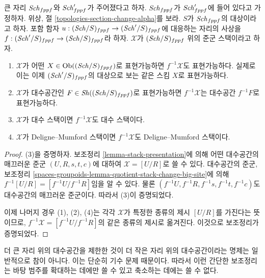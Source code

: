 \begin{lemma}
\label{lemma-change-big-site}
큰 자리 $\mathit{Sch}_{fppf}$와 $\mathit{Sch}'_{fppf}$가 주어졌다고 하자.
$\mathit{Sch}_{fppf}$가 $\mathit{Sch}'_{fppf}$에 들어 있다고 가정하자. 위상, 절
\ref{topologies-section-change-alpha}를 보라. $S$가 $\mathit{Sch}_{fppf}$의
대상이라고 하자. 포함 함자
$u : (\mathit{Sch}/S)_{fppf} \to (\mathit{Sch}'/S)_{fppf}$에 대응하는 자리의 사상을
$f : (\mathit{Sch}'/S)_{fppf} \to (\mathit{Sch}/S)_{fppf}$라 하자. $\mathcal{X}$가
$(\mathit{Sch}/S)_{fppf}$ 위의 준군 스택이라고 하자.
\begin{enumerate}
\item $\mathcal{X}$가 어떤 $X \in \mathop{\mathrm{Ob}}\nolimits((\mathit{Sch}/S)_{fppf})$로 표현가능하면
$f^{-1}\mathcal{X}$도 표현가능하다. 실제로 이는 이제
$(\mathit{Sch}'/S)_{fppf}$의 대상으로 보는 같은 스킴 $X$로 표현가능하다.
\item $\mathcal{X}$가 대수공간인 $F \in \mathop{\mathit{Sh}}\nolimits((\mathit{Sch}/S)_{fppf})$로
표현가능하면 $f^{-1}\mathcal{X}$는 대수공간 $f^{-1}F$로 표현가능하다.
\item $\mathcal{X}$가 대수 스택이면 $f^{-1}\mathcal{X}$도 대수 스택이다.
\item $\mathcal{X}$가 Deligne--Mumford 스택이면 $f^{-1}\mathcal{X}$도
Deligne--Mumford 스택이다.
\end{enumerate}
\end{lemma}

\begin{proof}
(3)을 증명하자. 보조정리 \ref{lemma-stack-presentation}에 의해 어떤
대수공간의 매끄러운 준군 $(U, R, s, t, c)$에 대하여
$\mathcal{X} = [U/R]$로 쓸 수 있다. 대수공간의 준군, 보조정리
\ref{spaces-groupoids-lemma-quotient-stack-change-big-site}에 의해
$f^{-1}[U/R] = [f^{-1}U/f^{-1}R]$임을 알 수 있다. 물론
$(f^{-1}U, f^{-1}R, f^{-1}s, f^{-1}t, f^{-1}c)$도 대수공간의 매끄러운
준군이다. 따라서 (3)이 증명되었다.

\medskip\noindent
이제 나머지 경우 (1), (2), (4)는 각각 $\mathcal{X}$가 특정한 종류의 제시
$[U/R]$를 가진다는 뜻이므로, $f^{-1}\mathcal{X} = [f^{-1}U/f^{-1}R]$의
같은 종류의 제시로 옮겨진다. 이것으로 보조정리가 증명되었다.
\end{proof}

\noindent
더 큰 자리 위의 대수공간을 제한한 것이 더 작은 자리 위의 대수공간이라는
명제는 일반적으로 참이 아니다. 이는 단순히 기수 문제 때문이다. 따라서
이런 간단한 보조정리는 바탕 범주를 확대하는 데에만 쓸 수 있고 축소하는
데에는 쓸 수 없다.

